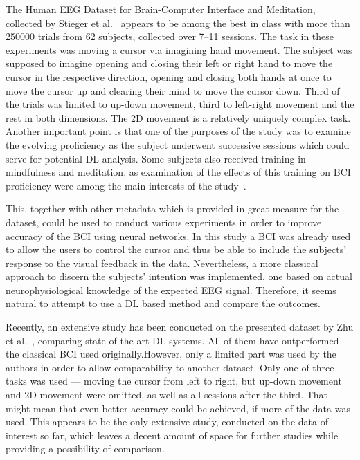 \documentclass[eng,BP]{thesiskiv}
\begin{document}
The Human EEG Dataset for Brain-Computer Interface and Meditation, collected by Stieger et al.~\cite{stieger:data:21} appears to be among the best in class with more than 250000 trials from 62 subjects, collected over 7--11 sessions.
The task in these experiments was moving a cursor via imagining hand movement. The subject was supposed to imagine opening and closing their left or right hand to move the cursor in the respective direction, opening and closing both hands at once to move the cursor up and clearing their mind to move the cursor down. Third of the trials was limited to up-down movement, third to left-right movement and the rest in both dimensions.
The 2D movement is a relatively uniquely complex task.
Another important point is that one of the purposes of the study was to examine the evolving proficiency as the subject underwent successive sessions which could serve for potential DL analysis.
Some subjects also received training in mindfulness and meditation, as examination of the effects of this training on BCI proficiency were among the main interests of the study~\cite{stieger:mindfulness:20}.

This, together with other metadata which is provided in great measure for the dataset, could be used to conduct various experiments in order to improve accuracy of the BCI using neural networks.
In this study a BCI was already used to allow the users to control the cursor and thus be able to include the subjects' response to the visual feedback in the data. Nevertheless, a more classical approach to discern the subjects' intention was implemented, one based on actual neurophysiological knowledge of the expected EEG signal. Therefore, it seems natural to attempt to use a DL based method and compare the outcomes.

Recently, an extensive study has been conducted on the presented dataset by Zhu et al.~\cite{zhu:dl:bci:mi:22}, comparing state-of-the-art DL systems. All of them have outperformed the classical BCI used originally.\@ However, only a limited part was used by the authors in order to allow comparability to another dataset. Only one of three tasks was used --- moving the cursor from left to right, but up-down movement and 2D movement were omitted, as well as all sessions after the third.
That might mean that even better accuracy could be achieved, if more of the data was used.
This appears to be the only extensive study, conducted on the data of interest so far, which leaves a decent amount of space for further studies while providing a possibility of comparison.
\end{document}
